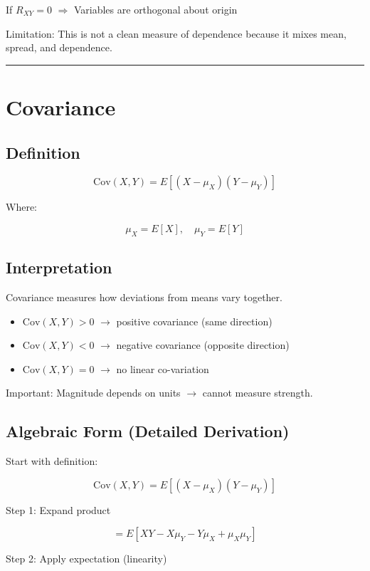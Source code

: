 \documentclass[12pt]{article}
\begin{document}
If $R_{XY} = 0$ $\Rightarrow$ Variables are orthogonal about origin

Limitation: This is not a clean measure of dependence because it mixes mean, spread, and dependence.

\hrule
\vspace{0.5cm}

\section{Covariance}

\subsection{Definition}

\[
\mathrm{Cov}(X,Y) = E[(X - \mu_X)(Y - \mu_Y)]
\]

Where:

\[
\mu_X = E[X], \quad \mu_Y = E[Y]
\]

\subsection{Interpretation}

Covariance measures how deviations from means vary together.

\begin{itemize}
\item $\mathrm{Cov}(X,Y) > 0$ $\rightarrow$ positive covariance (same direction)
\item $\mathrm{Cov}(X,Y) < 0$ $\rightarrow$ negative covariance (opposite direction)
\item $\mathrm{Cov}(X,Y) = 0$ $\rightarrow$ no linear co-variation
\end{itemize}

Important: Magnitude depends on units $\rightarrow$ cannot measure strength.

\subsection{Algebraic Form (Detailed Derivation)}

Start with definition:

\[
\mathrm{Cov}(X,Y) = E[(X - \mu_X)(Y - \mu_Y)]
\]

Step 1: Expand product

\[
= E[XY - X\mu_Y - Y\mu_X + \mu_X\mu_Y]
\]

Step 2: Apply expectation (linearity)
\end{document}
